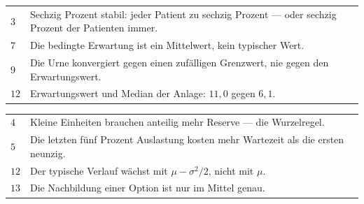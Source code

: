 \begin{merksatz}
\begin{center}
{\small
\renewcommand{\arraystretch}{1.48}
\begin{tabular}{@{}P{1.4cm}P{7.0cm}@{}}
\toprule
$3$ & Sechzig Prozent stabil: jeder Patient zu sechzig Prozent --- oder sechzig Prozent der Patienten immer.\\
$7$ & Die bedingte Erwartung ist ein Mittelwert, kein typischer Wert.\\
$9$ & Die Urne konvergiert gegen einen zufälligen Grenzwert, nie gegen den Erwartungswert.\\
$12$ & Erwartungswert und Median der Anlage: $11{,}0$ gegen $6{,}1$.\\
\bottomrule
\end{tabular}}
\end{center}

\begin{center}
\begin{minipage}{0.88\textwidth}
\end{minipage}
\end{center}
\end{merksatz}

\begin{merksatz}
\begin{center}
{\small
\renewcommand{\arraystretch}{1.48}
\begin{tabular}{@{}P{1.4cm}P{7.0cm}@{}}
\toprule
$4$ & Kleine Einheiten brauchen anteilig mehr Reserve --- die Wurzelregel.\\
$5$ & Die letzten fünf Prozent Auslastung kosten mehr Wartezeit als die ersten neunzig.\\
$12$ & Der typische Verlauf wächst mit $\mu - \sigma^{2}/2$, nicht mit $\mu$.\\
$13$ & Die Nachbildung einer Option ist nur im Mittel genau.\\
\bottomrule
\end{tabular}}
\end{center}

\begin{center}
\begin{minipage}{0.88\textwidth}
\end{minipage}
\end{center}
\end{merksatz}

